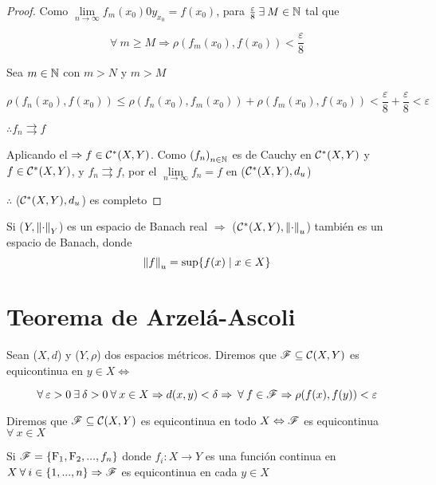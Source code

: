 \begin{proof}
    Como $\lim\limits_{n \to \infty} f_m(x_0) 0 y_{x_0} = f(x_0)$, para $\frac{\varepsilon}{8} \: \exists \: M \in \mathbb{N}$ tal que 

    $$\forall \: m \geqslant M \Rightarrow \rho(f_m(x_0), f(x_0)) < \frac{\varepsilon}{8}$$

    Sea $m \in \mathbb{N}$ con $m > N$ y $m > M$

    $$ \rho(f_n(x_0),f(x_0)) \leqslant \rho(f_n(x_0),f_m(x_0)) + \rho(f_m(x_0),f(x_0)) < \frac{\varepsilon}{8} + \frac{\varepsilon}{8} < \varepsilon$$

    $\therefore f_n \rightrightarrows f$

    Aplicando el  $\Rightarrow f \in  {\ensuremath{\mathcal{C}}}^{\ast}(X,Y)$. Como ${\left(f_n \right)}_{n \in \mathbb{N}}$ es de Cauchy en ${\mathcal{C}}^{\ast}(X,Y)$ y $f \in {\ensuremath{\mathcal{C}}}^{\ast}(X,Y)$, y $f_n \rightrightarrows f$, por el  $\lim\limits_{n \to \infty} f_n = f$ en (${\mathcal{C}}^{\ast}(X,Y), d_u$)

    $\therefore$ (${\mathcal{C}}^{\ast}(X,Y), d_u$) es completo
\end{proof}

\begin{corollary}
    Si ($Y, {\norm{\cdot}}_{Y}$) es un espacio de Banach real $\Rightarrow$ (${\mathcal{C}}^{\ast}(X,Y),{\norm{\cdot}}_{u} $) también es un espacio de Banach, donde 
    $${\norm{f}}_{u} = \sup \{ f(x) \mid x \in X \}$$
\end{corollary}

\section{Teorema de Arzelá-Ascoli}

\begin{definition} [Equicontinuidad]
    Sean ($X,d$) y ($Y, \rho$) dos espacios métricos. Diremos que $\mathscr{F} \subseteq \mathcal{C}(X,Y)$ es equicontinua en $y \in X \iff$

    $$\forall \: \varepsilon > 0 \: \exists \: \delta > 0 \: \forall \: x \in X \Rightarrow d(x,y) < \delta \Rightarrow \: \forall \: f \in \mathscr{F} \Rightarrow \rho(f(x),f(y)) < \varepsilon$$

    Diremos que $\mathscr{F} \subseteq \mathcal{C}(X,Y)$ es equicontinua en todo $X \Leftrightarrow \mathscr{F}$ es equicontinua $\forall \: x \in X$
\end{definition}

\begin{eg}
    Si $\mathscr{F} = \{ \mathrm{F}_1, \mathrm{F}_2, ..., f_n \}$ donde $f_i : X \to Y$ es una función continua en $X \: \forall \: i \in \{1, ..., n \} \Rightarrow \mathscr{F}$ es equicontinua en cada $y \in X$
\end{eg}

